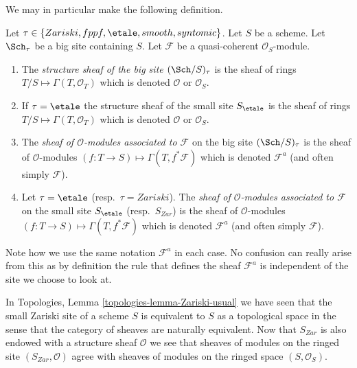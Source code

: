 \noindent
We may in particular make the following definition.

\begin{definition}
\label{definition-structure-sheaf}
Let $\tau \in \{Zariski, \linebreak[0] fppf, \linebreak[0]
\etale, \linebreak[0] smooth, \linebreak[0] syntomic\}$.
Let $S$ be a scheme.
Let $\Sch_\tau$ be a big site containing $S$.
Let $\mathcal{F}$ be a quasi-coherent $\mathcal{O}_S$-module.
\begin{enumerate}
\item The {\it structure sheaf of the big site $(\Sch/S)_\tau$}
is the sheaf of rings $T/S \mapsto \Gamma(T, \mathcal{O}_T)$ which is
denoted $\mathcal{O}$ or $\mathcal{O}_S$.
\item If $\tau = \etale$ the structure sheaf of the small site
$S_\etale$ is the sheaf of rings $T/S \mapsto \Gamma(T, \mathcal{O}_T)$
which is denoted $\mathcal{O}$ or $\mathcal{O}_S$.
\item The {\it sheaf of $\mathcal{O}$-modules associated to
$\mathcal{F}$} on the big site $(\Sch/S)_\tau$
is the sheaf of $\mathcal{O}$-modules
$(f : T \to S) \mapsto \Gamma(T, f^*\mathcal{F})$
which is denoted $\mathcal{F}^a$ (and often simply $\mathcal{F}$).
\item Let $\tau = \etale$ (resp.\ $\tau = Zariski$). The
{\it sheaf of $\mathcal{O}$-modules associated to $\mathcal{F}$}
on the small site $S_\etale$ (resp.\ $S_{Zar}$) is the sheaf of
$\mathcal{O}$-modules $(f : T \to S) \mapsto \Gamma(T, f^*\mathcal{F})$
which is denoted $\mathcal{F}^a$ (and often simply $\mathcal{F}$).
\end{enumerate}
\end{definition}

\noindent
Note how we use the same notation $\mathcal{F}^a$ in each case.
No confusion can really arise from this as by definition the rule
that defines the sheaf $\mathcal{F}^a$ is independent of the site
we choose to look at.

\begin{remark}
\label{remark-Zariski-site-space}
In Topologies, Lemma \ref{topologies-lemma-Zariski-usual}
we have seen that the small Zariski site of a scheme $S$ is
equivalent to $S$ as a topological space in the sense that the
category of sheaves are naturally equivalent. Now that $S_{Zar}$
is also endowed with a structure sheaf $\mathcal{O}$ we see
that sheaves of modules on the ringed site $(S_{Zar}, \mathcal{O})$
agree with sheaves of modules on the ringed space $(S, \mathcal{O}_S)$.
\end{remark}


